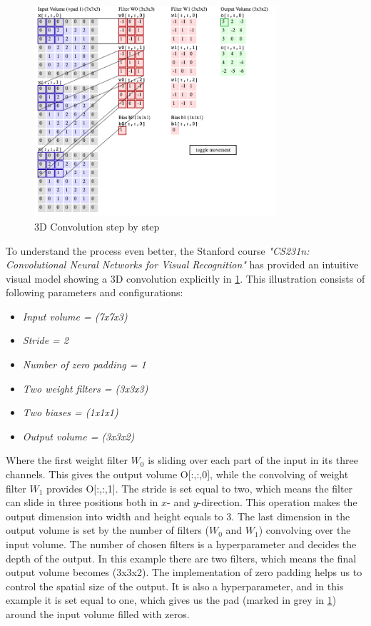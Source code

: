\documentclass[USenglish]{ifimaster}  %
\begin{document}
\begin{figure}[ht]
    \centering
    \includegraphics[width=0.8\textwidth]{bilder/conv2.png}
    \caption{3D Convolution step by step \cite{website:cs231n}}
    \label{fig:conv}
\end{figure}
To understand the process even better, the Stanford course \textit{"CS231n: Convolutional Neural Networks for Visual Recognition"} has provided an intuitive visual model showing a 3D convolution explicitly in \cref{fig:conv}. This illustration consists of following parameters and configurations:

\begin{itemize}
    \item \textit{Input volume = (7x7x3)}
    \item \textit{Stride = 2}
    \item \textit{Number of zero padding = 1}
    \item \textit{Two weight filters = (3x3x3)}
    \item \textit{Two biases = (1x1x1)}
    \item \textit{Output volume = (3x3x2)}
\end{itemize}
Where the first weight filter $W_0$ is sliding over each part of the input in its three channels. This gives the output volume O[:,:,0], while the convolving of weight filter $W_1$ provides O[:,:,1]. The stride is set equal to two, which means the filter can slide in three positions both in $x$- and $y$-direction. This operation makes the output dimension into width and height equals to 3. The last dimension in the output volume is set by the number of filters ($W_0$ and $W_1$) convolving over the input volume. The number of chosen filters is a hyperparameter and decides the depth of the output. In this example there are two filters, which means the final output volume becomes (3x3x2). 
The implementation of zero padding helps us to control the spatial size of the output. It is also a hyperparameter, and in this example it is set equal to one, which gives us the pad (marked in grey in \cref{fig:conv}) around the input volume filled with zeros. 
\end{document}
